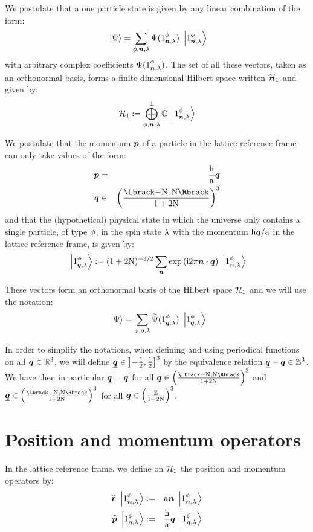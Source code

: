 \documentclass[10pt,a4paper,twoside,openany]{book}
\begin{document}
We postulate that a one particle state is given by any linear combination of the form:
\begin{equation*}
\ket{\Psi} = \sum_{\pt,\n,\sp} \Psi(\bX 1 \pt \n \sp) \ketX 1 \pt \n \sp
\end{equation*}
with arbitrary complex coefficients $\Psi(\bX 1 \pt \n \sp)$. The set of all these vectors, taken as an orthonormal basis, forms a finite dimensional Hilbert space written $\Hn 1$ and given by:
\begin{equation*}
\Hn 1 \eqdef \bigoplus^\perp_{\pt,\n,\sp} \IC \ketX 1 \pt \n \sp
\end{equation*}

 We postulate that the momentum $\p$ of a particle in the lattice reference frame can only take values of the form:
\begin{eqnarray*}
\p & = & \frac \h \a \q\\
\q & \in & \FLD
\end{eqnarray*}
and that the (hypothetical) physical state in which the universe only contains a single particle, of type $\pt$, in the spin state $\sp$ with the momentum $\h\q / \a$ in the lattice reference frame, is given by:
\begin{equation*}
\ketQ 1 \pt \q \sp \eqdef (1+2 \N)^{-3/2} \sum_{\n} \exp{\i 2 \pi \n \ssp \q} \ketX 1 \pt \n \sp
\end{equation*}

These vectors form an orthonormal basis of the Hilbert space $\Hn 1$ and we will use the notation:
\begin{equation*}
\ket\Psi = \sum_{\pt,\q,\sp} \FT\Psi(\bQ 1 \pt \q \sp) \ketQ 1 \pt \q \sp
\end{equation*}

 In order to simplify the notations, when defining and using periodical functions on all $\q \in \IR^3$, we will define $\eqp \q \in \left]-\frac 1 2,\frac 1 2\right]^3$ by the equivalence relation $\eqp \q - \q \in \IZ^3$. We have then in particular $\eqp \q = \q$ for all $\q \in \FLD$ and $\eqp \q \in \FLD$ for all $\q \in \ILD$.

\section{Position and momentum operators}

 In the lattice reference frame, we define on $\Hn 1$ the position and momentum operators by:
\begin{eqnarray*}
\Rop \ketX 1 \pt \n \sp & \eqdef & \a \n \ketX 1 \pt \n \sp \\
\Pop \ketQ 1 \pt \q \sp & \eqdef & \frac \h \a \q \ketQ 1 \pt \q \sp
\end{eqnarray*}
\end{document}
